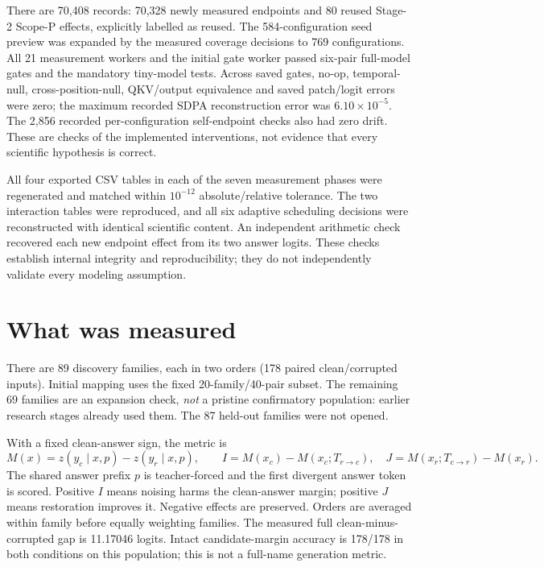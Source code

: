 \documentclass[11pt,a4paper]{article}
\begin{document}
\begin{table}[htbp]\centering\small

\caption{Actual completed measurement schedule. Record counts include both directions in the extension phases. They exclude gate and capture forwards.}
\end{table}

There are 70,408 records: 70,328 newly measured endpoints and 80 reused Stage-2 Scope-P effects, explicitly labelled as reused. The 584-configuration seed preview was expanded by the measured coverage decisions to 769 configurations. All 21 measurement workers and the initial gate worker passed six-pair full-model gates and the mandatory tiny-model tests. Across saved gates, no-op, temporal-null, cross-position-null, QKV/output equivalence and saved patch/logit errors were zero; the maximum recorded SDPA reconstruction error was $6.10\times10^{-5}$. The 2,856 recorded per-configuration self-endpoint checks also had zero drift. These are checks of the implemented interventions, not evidence that every scientific hypothesis is correct.

All four exported CSV tables in each of the seven measurement phases were regenerated and matched within $10^{-12}$ absolute/relative tolerance. The two interaction tables were reproduced, and all six adaptive scheduling decisions were reconstructed with identical scientific content. An independent arithmetic check recovered each new endpoint effect from its two answer logits. These checks establish internal integrity and reproducibility; they do not independently validate every modeling assumption.

\section{What was measured}
\label{sec:measurement}
There are 89 discovery families, each in two orders (178 paired clean/corrupted inputs). Initial mapping uses the fixed 20-family/40-pair subset. The remaining 69 families are an expansion check, \emph{not} a pristine confirmatory population: earlier research stages already used them. The 87 held-out families were not opened.

With a fixed clean-answer sign, the metric is
\[
 M(x)=z(y_c\mid x,p)-z(y_r\mid x,p),\qquad
 I=M(x_c)-M(x_c;T_{r\to c}),\quad
 J=M(x_r;T_{c\to r})-M(x_r).
\]
The shared answer prefix $p$ is teacher-forced and the first divergent answer token is scored. Positive $I$ means noising harms the clean-answer margin; positive $J$ means restoration improves it. Negative effects are preserved. Orders are averaged within family before equally weighting families. The measured full clean-minus-corrupted gap is 11.17046 logits. Intact candidate-margin accuracy is 178/178 in both conditions on this population; this is not a full-name generation metric.
\end{document}
